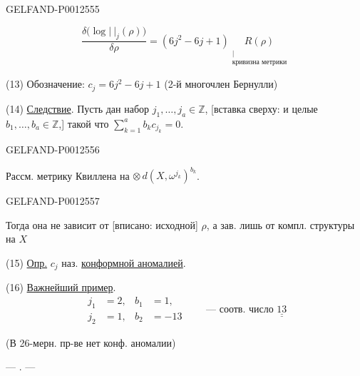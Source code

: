 \begin{GelfandAdjacentEvidence}{GELFAND-P001255}{5}

\begin{equation*}
\frac{\delta\bigl(\log\lvert\ \rvert_j(\rho)\bigr)}{\delta\rho}
=(6j^2-6j+1)\underset{\substack{\vert\\\text{кривизна метрики}}}{R(\rho)}
\end{equation*}

\noindent (13) Обозначение: $c_j=6j^2-6j+1$
\qquad (2-й многочлен Бернулли)

\noindent (14) \underline{Следствие}.
Пусть дан набор $j_1,\ldots,j_a\in\mathbb Z$,
[вставка сверху: и целые $b_1,\ldots,b_a\in\mathbb Z$,]
такой что $\sum_{k=1}^{a}b_kc_{j_k}=0$.
\end{GelfandAdjacentEvidence}
\begin{GelfandAdjacentEvidence}{GELFAND-P001255}{6}


Рассм. метрику Квиллена на $\otimes\,d(X,\omega^{j_k})^{b_k}$.
\end{GelfandAdjacentEvidence}
\begin{GelfandAdjacentEvidence}{GELFAND-P001255}{7}

Тогда она не зависит от [вписано: исходной] $\rho$,
а зав. лишь от компл. структуры на $X$

\noindent (15) \underline{Опр.} $c_j$ наз. \underline{конформной аномалией}.

\noindent (16) \underline{Важнейший пример}.
\begin{equation*}
\begin{aligned}
j_1&=2,&b_1&=1,\\
j_2&=1,&b_2&=-13
\end{aligned}
\qquad\text{— соотв. число }\underline{\underline{13}}
\end{equation*}
\end{GelfandAdjacentEvidence}


(В 26-мерн. пр-ве нет конф. аномалии)
\begin{center}— . —\end{center}


